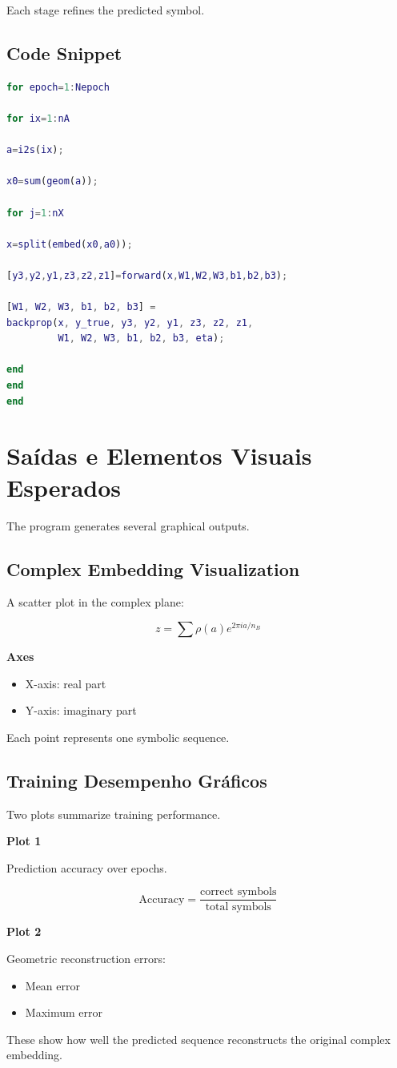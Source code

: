 Each stage refines the predicted symbol.

\subsection{Code Snippet}

\begin{lstlisting}[language=Matlab]
for epoch=1:Nepoch

for ix=1:nA

a=i2s(ix);

x0=sum(geom(a));

for j=1:nX

x=split(embed(x0,a0));

[y3,y2,y1,z3,z2,z1]=forward(x,W1,W2,W3,b1,b2,b3);

[W1, W2, W3, b1, b2, b3] =
backprop(x, y_true, y3, y2, y1, z3, z2, z1,
         W1, W2, W3, b1, b2, b3, eta);

end
end
end
\end{lstlisting}

\newpage

\section{Saídas e Elementos Visuais Esperados}

The program generates several graphical outputs.

\subsection{Complex Embedding Visualization}

A scatter plot in the complex plane:

\[
z = \sum \rho(a)e^{2\pi ia/n_B}
\]

\textbf{Axes}

\begin{itemize}
\item X-axis: real part
\item Y-axis: imaginary part
\end{itemize}

Each point represents one symbolic sequence.

\subsection{Training Desempenho Gráficos}

Two plots summarize training performance.

\textbf{Plot 1}

Prediction accuracy over epochs.

\[
\text{Accuracy} =
\frac{\text{correct symbols}}{\text{total symbols}}
\]

\textbf{Plot 2}

Geometric reconstruction errors:

\begin{itemize}
\item Mean error
\item Maximum error
\end{itemize}

These show how well the predicted sequence reconstructs the original complex embedding.
